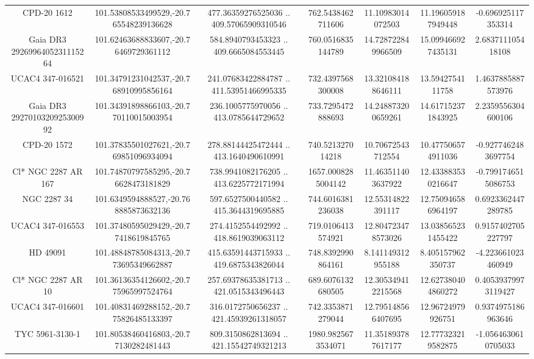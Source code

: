 \begin{table}
\begin{tabular}{ccccccc}
CPD-20  1612 & 101.53808533499529,-20.765548239136628 & 477.36359276525036 .. 409.57065909310546 & 762.5438462711606 & 11.10983014072503 & 11.196059187949448 & -0.696925117353314 \\
Gaia DR3 2926996405231115264 & 101.62463688833607,-20.76469729361112 & 584.8940793453323 .. 409.6665084553445 & 760.0516835144789 & 14.728722849966509 & 15.099466927435131 & 2.683711105418108 \\
UCAC4 347-016521 & 101.34791231042537,-20.768910995856164 & 241.07683422884787 .. 411.53951466995335 & 732.4397568300008 & 13.321084188646111 & 13.5942754111758 & 1.4637885887573976 \\
Gaia DR3 2927010320925300992 & 101.34391898866103,-20.770110015003954 & 236.1005775970056 .. 413.0785644729652 & 733.7295472888693 & 14.248873200659261 & 14.617152371843925 & 2.2359556304600106 \\
CPD-20  1572 & 101.37835501027621,-20.769851096934094 & 278.88144425472444 .. 413.1640490610991 & 740.521327014218 & 10.70672543712554 & 10.477506574911036 & -0.9277462483697754 \\
Cl* NGC 2287     AR     167 & 101.74870797585295,-20.76628473181829 & 738.9941082176205 .. 413.6225772171994 & 1657.0008285004142 & 11.463511403637922 & 12.433883530216647 & -0.7991746515086753 \\
NGC  2287    34 & 101.6349594888527,-20.768885873632136 & 597.6527500440582 .. 415.3644319695885 & 744.6016381236038 & 12.55314822391117 & 12.750946586964197 & 0.6923362447289785 \\
UCAC4 347-016553 & 101.37480595029429,-20.77418619845765 & 274.4152554492992 .. 418.8619039063112 & 719.0106413574921 & 12.804723478573026 & 13.038565231455422 & 0.9157402705227797 \\
HD  49091 & 101.48848785084313,-20.773695349662887 & 415.63591443715933 .. 419.6875343826044 & 748.8392990864161 & 8.141149312955188 & 8.405157962350737 & -4.223661023460949 \\
Cl* NGC 2287     AR      10 & 101.36136354126602,-20.775965997524764 & 257.69378635381713 .. 421.0515343496443 & 689.6076132680505 & 12.305349412215568 & 12.627380404860272 & 0.40539379973119427 \\
UCAC4 347-016601 & 101.40831469288152,-20.775826485133397 & 316.0172750656237 .. 421.45939261318057 & 742.3353871279044 & 12.795148566407695 & 12.96724979926751 & 0.9374975186963646 \\
TYC 5961-3130-1 & 101.80538460416803,-20.77130282481443 & 809.3150862813694 .. 421.15542749321213 & 1980.9825673534071 & 11.351893787617177 & 12.777323219582875 & -1.0564630610705033 \\

\end{tabular}
\end{table}
